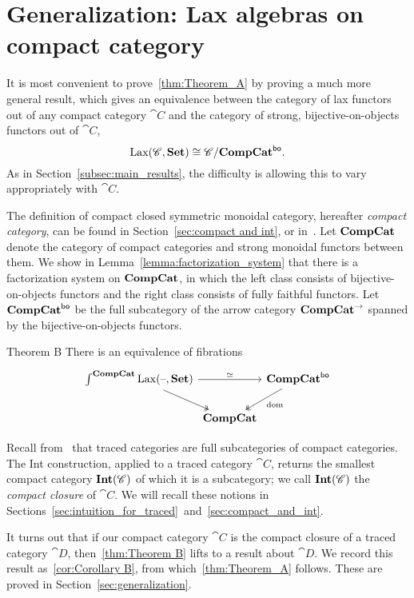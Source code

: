 \documentclass[12pt,oneside,article,draft]{memoir}
\begin{document}
\section{Generalization: Lax algebras on compact category}

It is most convenient to prove~\ref{thm:Theorem_A} by proving a much more general result, which
gives an equivalence between the category of lax functors out of any compact category $\cat{C}$ and the category of
strong, bijective-on-objects functors out of $\cat{C}$,
$$
\operatorname{Lax}(\mathscr{C},\mathbf{Set})\cong\mathscr{C}/\mathbf{CompCat}^{\mathsf{bo}}.
$$  
As in Section~\ref{subsec:main_results}, the difficulty is allowing this to vary appropriately with $\cat{C}$.

The definition of compact closed symmetric
monoidal category, hereafter \emph{compact category}, can be found in Section~\ref{sec:compact and
int}, or in~\cite{MacLane}.  Let $\mathbf{CompCat}$ denote the category of compact categories and strong
monoidal functors between them.  We show in Lemma~\ref{lemma:factorization_system} that there is a
factorization system on $\mathbf{CompCat}$, in which the left class consists of bijective-on-objects
functors and the right class consists of fully faithful functors. Let $\mathbf{CompCat}^{\mathsf{bo}}$ be the full
subcategory of the arrow category $\mathbf{CompCat}^{\to}$ spanned by the bijective-on-objects functors.  

\begin{named}{Theorem B}
   There is an equivalence of fibrations
   \begin{equation*}
      \begin{tikzcd}[column sep=0em]
         \int^{\CompCat}\Lax(\textrm{--},\Set) \ar[rr,"\equiv"] \ar[dr,two heads]
            && \CompCat^{\bo} \ar[dl,two heads,"\dom"] \\
            & \CompCat &
      \end{tikzcd}
   \end{equation*}
\end{named}

Recall from~\cite{JoyalStreetVerity} that traced categories are full subcategories of compact
categories.  The Int construction, applied to a traced category $\cat{C}$, returns the smallest
compact category $\mathbf{Int}(\mathscr{C})$ of which it is a subcategory; we call $\mathbf{Int}(\mathscr{C})$ the
\emph{compact closure} of $\cat{C}$. We will recall these notions in Sections~\ref{sec:intuition_for_traced}~and~\ref{sec:compact_and_int}.

It turns out that if our compact category $\cat{C}$ is the compact closure of a traced category
$\cat{D}$, then~\ref{thm:Theorem B} lifts to a result about $\cat{D}$.  We record this result
as~\ref{cor:Corollary B}, from which~\ref{thm:Theorem_A} follows.  These are proved in
Section~\ref{sec:generalization}.
\end{document}
